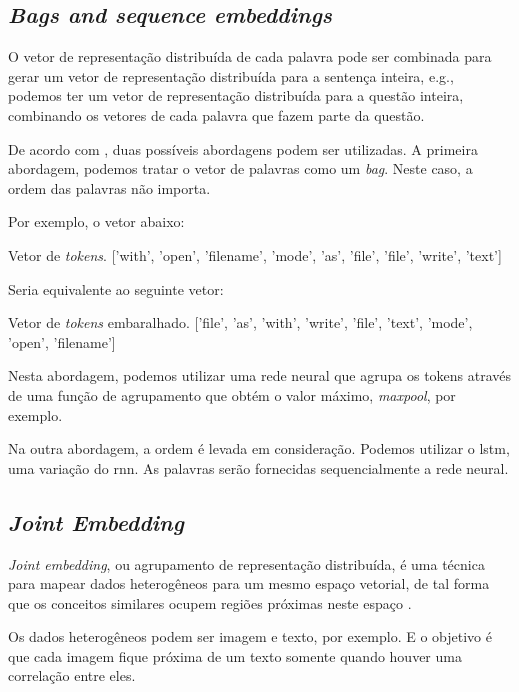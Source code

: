\subsection{\textit{Bags and sequence embeddings}}

O vetor de representação distribuída de cada palavra pode ser combinada para gerar um vetor de representação distribuída para a sentença inteira, e.g., podemos ter um vetor de representação distribuída para a questão inteira, combinando os vetores de cada palavra que fazem parte da questão.

De acordo com \cite{cambronero-deep-learning-code-search:2019}, duas possíveis abordagens podem ser utilizadas. A primeira abordagem, podemos tratar o vetor de palavras como um \textit{bag}. Neste caso, a ordem das palavras não importa.

Por exemplo, o vetor abaixo:

\begin{mypythonembedding}{Vetor de \textit{tokens}.}
  ['with', 'open', 'filename', 'mode', 'as', 'file', 'file', 'write', 'text']
\end{mypythonembedding}

Seria equivalente ao seguinte vetor:

\begin{mypythonembedding}{Vetor de \textit{tokens} embaralhado.}
['file', 'as', 'with', 'write', 'file', 'text', 'mode', 'open', 'filename']
\end{mypythonembedding}

Nesta abordagem, podemos utilizar uma rede neural que agrupa os tokens através de uma função de agrupamento que obtém o valor máximo, \textit{maxpool}, por exemplo.

Na outra abordagem, a ordem é levada em consideração. Podemos utilizar o \acrfull{lstm}, uma variação do \acrfull{rnn}. As palavras serão fornecidas sequencialmente a rede neural.

\subsection{\textit{Joint Embedding}}

\textit{Joint embedding}, ou agrupamento de representação distribuída, é uma técnica para mapear dados heterogêneos para um mesmo espaço vetorial, de tal forma que os conceitos similares ocupem regiões próximas neste espaço \citep{Gu-deep-code-search:2018}.

Os dados heterogêneos podem ser imagem e texto, por exemplo. E o objetivo é que cada imagem fique próxima de um texto somente quando houver uma correlação entre eles.

